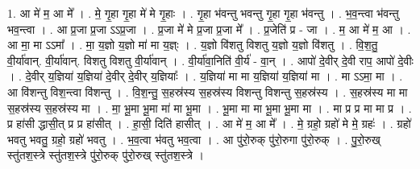\documentclass[17pt]{extarticle}
\begin{document}
1. आ मे॑ म॒ आ मे᳚ । . मे॒ गृ॒हा गृ॒हा मे॑ मे गृ॒हाः । . गृ॒हा भ॑वन्तु भवन्तु गृ॒हा गृ॒हा भ॑वन्तु । . भ॒व॒न्त्वा भ॑वन्तु भव॒न्त्वा । . आ प्र॒जा प्र॒जा ऽऽप्र॒जा । . प्र॒जा मे॑ मे प्र॒जा प्र॒जा मे᳚ । . प्र॒जेति॑ प्र - जा । . म॒ आ मे॑ म॒ आ । . आ मा॒ मा ऽऽमा᳚ । . मा॒ य॒ज्ञो य॒ज्ञो मा॑ मा य॒ज्ञ्ः । . य॒ज्ञो वि॑शतु विशतु य॒ज्ञो य॒ज्ञो वि॑शतु । . वि॒श॒तु॒ वी॒र्या॑वान्. वी॒र्या॑वान्. विशतु विशतु वी॒र्या॑वान् । . वी॒र्या॑वा॒निति॑ वी॒र्य॑ - वा॒न् । . आपो॑ दे॒वीर् दे॒वी राप॒ आपो॑ दे॒वीः । . दे॒वीर् य॒ज्ञिया॑ य॒ज्ञिया॑ दे॒वीर् दे॒वीर् य॒ज्ञियाः᳚ । . य॒ज्ञिया॑ मा मा य॒ज्ञिया॑ य॒ज्ञिया॑ मा । . मा ऽऽमा॒ मा । . आ वि॑शन्तु विश॒न्त्वा वि॑शन्तु । . वि॒श॒न्तु॒ स॒हस्र॑स्य स॒हस्र॑स्य विशन्तु विशन्तु स॒हस्र॑स्य । . स॒हस्र॑स्य मा मा स॒हस्र॑स्य स॒हस्र॑स्य मा । . मा॒ भू॒मा भू॒मा मा॑ मा भू॒मा । . भू॒मा मा मा भू॒मा भू॒मा मा । . मा प्र प्र मा मा प्र । . प्र हा॑सी द्धासी॒त् प्र प्र हा॑सीत् । . हा॒सी॒ दिति॑ हासीत् । . आ मे॑ म॒ आ मे᳚ । . मे॒ ग्रहो॒ ग्रहो॑ मे मे॒ ग्रहः॑ । . ग्रहो॑ भवतु भवतु॒ ग्रहो॒ ग्रहो॑ भवतु । . भ॒व॒त्वा भ॑वतु भव॒त्वा । . आ पु॑रो॒रुक् पु॑रो॒रुगा पु॑रो॒रुक् । . पु॒रो॒रुख् स्तु॑तश॒स्त्रे स्तु॑तश॒स्त्रे पु॑रो॒रुक् पु॑रो॒रुख् स्तु॑तश॒स्त्रे । \newline
\end{document}
